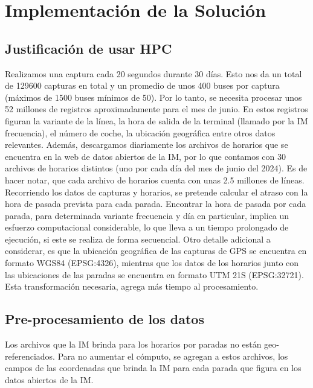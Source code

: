 \documentclass[journal]{IEEEtran}
\begin{document}



\section{Implementación de la Solución}
\subsection{Justificación de usar HPC}
Realizamos una captura cada 20 segundos durante 30 días. Esto nos da un total de 129600 capturas en total y un promedio de unos 400 buses por captura (máximos de 1500 buses mínimos de 50). Por lo tanto, se necesita procesar unos 52 millones de registros aproximadamente para el mes de junio.
En estos registros figuran la variante de la línea, la hora de salida de la terminal (llamado por la IM frecuencia), el número de coche, la ubicación geográfica entre otros datos relevantes. Además, descargamos diariamente los archivos de horarios que se encuentra en la web de datos abiertos de la IM, por lo que contamos con 30 archivos de horarios distintos (uno por cada día del mes de junio del 2024). Es de hacer notar, que cada archivo de horarios cuenta con unas 2.5 millones de líneas. Recorriendo los datos de capturas y horarios, se pretende calcular el atraso con la hora de pasada prevista para cada parada. Encontrar la hora de pasada por cada parada, para determinada variante frecuencia y día en particular, implica un esfuerzo computacional considerable, lo que lleva a un tiempo prolongado de ejecución, si este se realiza de forma secuencial. Otro detalle adicional a considerar, es que la ubicación geográfica de las capturas de GPS se encuentra en formato WGS84 (EPSG:4326), mientras que los datos de los horarios junto con las ubicaciones de las paradas se encuentra en formato UTM 21S (EPSG:32721). Esta transformación necesaria, agrega más tiempo al procesamiento.

\subsection{Pre-procesamiento de los datos}
Los archivos que la IM brinda para los horarios por paradas no están geo-referenciados. Para no aumentar el cómputo, se agregan a estos archivos, los campos de las coordenadas que brinda la IM para cada parada que figura en los datos abiertos de la IM. \cite{paradas}
\end{document}
